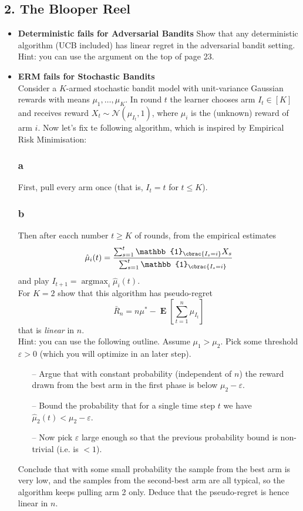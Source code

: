 \documentclass[10pt, a4paper, twoside]{amsart}
\theoremstyle{plain}
\DeclarePairedDelimiter\cbrac\{\}
\newcommand{\Ind}{\ensuremath{\mathbb{1}}}
\newcommand{\argmax}{\operatorname*{argmax}}
\newcommand{\Ev}{\operatorname*{\ensuremath{\mathbf{E}}}} %
\begin{document}
\subsection*{2. The Blooper Reel}
\begin{itemize}
    \item \textbf{Deterministic fails for Adversarial Bandits} Show that any deterministic algorithm (UCB included) has linear regret in the adversarial bandit setting. Hint: you can use the argument on the top of page 23.
    \item \textbf{ERM fails for Stochastic Bandits} \\
    Consider a $K$-armed stochastic bandit model with unit-variance Gaussian rewards with means $\mu_1,\ldots ,\mu_K$. In round $t$ the learner chooses arm $I_t \in [K]$ and receives reward $X_t \sim \mathcal{N}(\mu_{I_t}, 1)$, where $\mu_i$ is the (unknown) reward of arm $i$. Now let's fix te following algorithm, which is inspired by Empirical Risk Minimisation:
    \subsubsection*{a} First, pull every arm once (that is, $I_t = t$ for $t \leq K$).
    \subsubsection*{b} Then after eacch number $t \geq K$ of rounds, from the empirical estimates
    \begin{equation*}
        \hat{\mu}_i(t) = \frac{\sum_{s=1}^t \Ind_{\cbrac{I_s = i}} X_s}{\sum_{s=1}^t \Ind_{\cbrac{I_s =i}}}
    \end{equation*}
    and play $I_{t+1} = \argmax_i \hat{\mu}_i(t)$.\\
    For $K = 2$ show that this algorithm has pseudo-regret
    \begin{equation*}
        \bar{R}_n = n\mu^* - \Ev \left[ \sum_{t=1}^n \mu_{I_t} \right]
    \end{equation*}
    that is \textit{linear} in $n$.\\
    Hint: you can use the following outline. Assume $\mu_1 > \mu_2$. Pick some threshold $\varepsilon >0$ (which you will optimize in an later step).
    \begin{itemize}
        \item[--] Argue that with constant probability (independent of $n$) the reward drawn from the best arm in the first phase is below $\mu_2 - \varepsilon$.
        \item[--] Bound the probability that for a single time step $t$ we have $\hat{\mu}_2(t) < \mu_2 - \varepsilon$.
        \item[--] Now pick $\varepsilon$ large enough so that the previous probability bound is non-trivial (i.e. is $<1$).
    \end{itemize}
    Conclude that with some small probability the sample from the best arm is very low, and the samples from the second-best arm are all typical, so the algorithm keeps pulling arm 2 only. Deduce that the pseudo-regret is hence linear in $n$.
\end{itemize}
\end{document}

